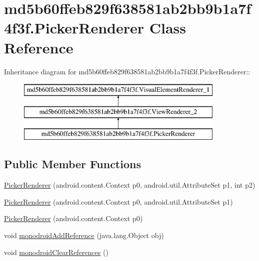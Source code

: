 \hypertarget{classmd5b60ffeb829f638581ab2bb9b1a7f4f3f_1_1_picker_renderer}{
\section{md5b60ffeb829f638581ab2bb9b1a7f4f3f.PickerRenderer Class Reference}
\label{classmd5b60ffeb829f638581ab2bb9b1a7f4f3f_1_1_picker_renderer}
}
Inheritance diagram for md5b60ffeb829f638581ab2bb9b1a7f4f3f.PickerRenderer::\begin{figure}[H]
\begin{center}
\leavevmode
\includegraphics[height=3cm]{classmd5b60ffeb829f638581ab2bb9b1a7f4f3f_1_1_picker_renderer}
\end{center}
\end{figure}
\subsection*{Public Member Functions}
\begin{CompactItemize}
\item 
\hyperlink{classmd5b60ffeb829f638581ab2bb9b1a7f4f3f_1_1_picker_renderer_461011fae58fd61c16bddd9354a0e2ee}{PickerRenderer} (android.content.Context p0, android.util.AttributeSet p1, int p2)
\item 
\hyperlink{classmd5b60ffeb829f638581ab2bb9b1a7f4f3f_1_1_picker_renderer_9fd2bcb1d380420ff920cacf999ff555}{PickerRenderer} (android.content.Context p0, android.util.AttributeSet p1)
\item 
\hyperlink{classmd5b60ffeb829f638581ab2bb9b1a7f4f3f_1_1_picker_renderer_9880f6ec6bfd5158d950ca6e6f6a9bf9}{PickerRenderer} (android.content.Context p0)
\item 
void \hyperlink{classmd5b60ffeb829f638581ab2bb9b1a7f4f3f_1_1_picker_renderer_c220cbf2703931a21301fff234bdcd51}{monodroidAddReference} (java.lang.Object obj)
\item 
void \hyperlink{classmd5b60ffeb829f638581ab2bb9b1a7f4f3f_1_1_picker_renderer_1da45f3e35fc65d101c94408a81964f7}{monodroidClearReferences} ()
\end{CompactItemize}
